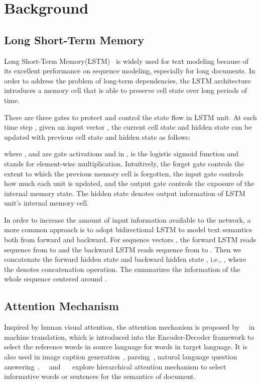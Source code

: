 \documentclass[letterpaper]{article} \usepackage{aaai18}  \usepackage{times}  \usepackage{helvet}  \usepackage{courier}  \usepackage{url}  \usepackage{graphicx}  \frenchspacing  \usepackage{amsmath}
\begin{document}
\section{Background}
\subsection{Long Short-Term Memory}
Long Short-Term Memory(LSTM)~\cite{Hochreiter1997Long} is widely used for text modeling because of its excellent performance on sequence modeling, especially for long documents. In order to address the problem of long-term dependencies, the LSTM architecture introduces a memory cell that is able to preserve cell state over long periods of time.

There are three gates to protect and control the state flow in LSTM unit. At each time step , given an input vector , the current cell state  and hidden state  can be updated with previous cell state  and hidden state  as follows:

where ,  and  are gate activations and in ,  is the logistic sigmoid function and  stands for element-wise multiplication. Intuitively, the forget gate  controls the extent to which the previous memory cell is forgotten, the input gate  controls how much each unit is updated, and the output gate  controls the exposure of the internal memory state. The hidden state  denotes output information of LSTM unit's internal memory cell.

In order to increase the amount of input information available to the network, a more common approach is to adopt bidirectional LSTM to model text semantics both from forward and backward. For sequence vectors , the forward LSTM reads sequence from  to  and the backward LSTM reads sequence from  to . Then we concatenate the forward hidden state  and backward hidden state , i.e., , where the  denotes concatenation operation. The  summarizes the information of the whole sequence centered around .

\subsection{Attention Mechanism}
Inspired by human visual attention, the attention mechanism is proposed by~\citeauthor{bahdanau2014neural}~ in machine translation, which is introduced into the Encoder-Decoder framework to select the reference words in source language for words in target language. It is also used in image caption generation~\cite{xu2015show}, parsing~\cite{vinyals2015grammar}, natural language question answering~\cite{sukhbaatar2015end}.~\citeauthor{yang2016hierarchical}~ and ~\citeauthor{chen2016neural}~ explore hierarchical attention mechanism to select informative words or sentences for the semantics of document.
\end{document}
